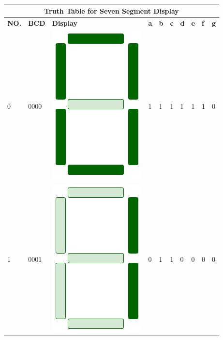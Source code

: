 \documentclass[12pt,singleside,a4paper]{article}
\begin{document}
\begin{center}
\begin{tabular}{ |p{1cm}|p{1cm}|p{1.5cm}|p{1cm}|p{1cm}|p{1cm}|p{1cm}|p{1cm}|p{1cm}|p{1cm}|} \hline
 \multicolumn{10}{|c|}{Truth Table for Seven Segment Display}   \\ \hline \hline
    \textbf{NO.} &   \textbf{BCD}     &   \textbf{Display} &   \textbf{a}   &   \textbf{b}  &   \textbf{c}   &   \textbf{d}   &   \textbf{e}   &   \textbf{f}   &   \textbf{g}   \\ \hline
    0   &   0000    &    \includegraphics[scale=0.1]{Display/0.png}       &   1   &   1   &   1   &   1   &   1   &   1   &   0   \\\hline
    1   &   0001    &    \includegraphics[scale=0.1]{Display/1.png}        &   0   &   1   &   1   &   0   &   0   &   0   &   0   \\\hline

\end{tabular}
\end{center}
\end{document}
